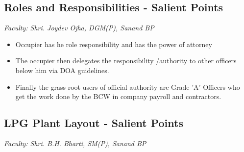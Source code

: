\documentclass{report}
\begin{document}
	\subsection{Roles and Responsibilities - Salient Points}
	\textit{Faculty: Shri. Joydev Ojha, DGM(P), Sanand BP}
	\begin{itemize}
		\item Occupier has he role responsibility and has the power of attorney
		\item The occupier then delegates the responsibility /authority to other officers below him via DOA guidelines.
		\item Finally the grass root users of official authority are Grade 'A' Officers who get the work done by the BCW in company payroll and contractors.
	\end{itemize}
	\subsection{LPG Plant Layout - Salient Points}
	\textit{Faculty: Shri. B.H. Bharti, SM(P), Sanand BP}
\end{document}
